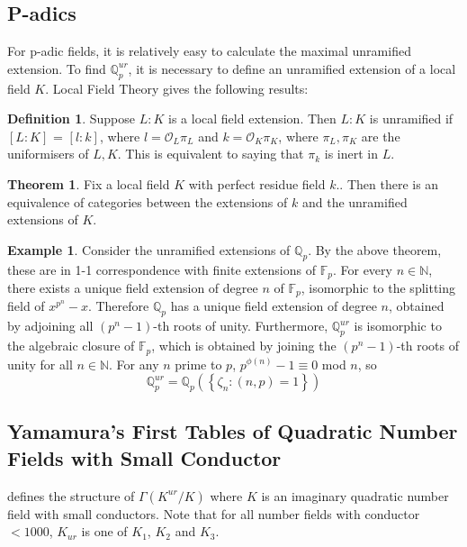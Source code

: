 \documentclass[12pt]{extarticle}
\newcommand{\N}{\mathbb{N}}
\newcommand{\F}{\mathbb{F}}
\newcommand{\Q}{\mathbb{Q}}
\newcommand{\co}{\mathcal{O}}
\newcommand{\<}{\langle}
\renewcommand{\>}{\rangle}
\theoremstyle{definition}
\newtheorem{theorem}{Theorem}
\newtheorem*{definition}{Definition}
\newtheorem*{example}{Example}
\begin{document}
\subsection{P-adics}
For p-adic fields, it is relatively easy to calculate the maximal unramified extension. 
To find $\Q_p^{ur}$, it is necessary to define an unramified extension of a local field $K$. Local Field Theory gives the following results:
\begin{definition}
Suppose $L:K$ is a local field extension. Then $L:K$ is unramified if $[L:K]$ = $[l:k]$, where $l = \co_L\pi_L$ and $ k= \co_K\pi_K$, where $\pi_L,\pi_K$ are the uniformisers of $L,K$. This is equivalent to saying that $\pi_k$ is inert in $L$. 
\end{definition}
\begin{theorem}
Fix a local field $K$ with perfect residue field $k$.. Then there is an equivalence of categories
between the extensions of $k$ and the unramified extensions of $K$. 
\end{theorem}
\begin{example}
Consider the unramified extensions of $\Q_p$. By the above theorem, these are in 1-1 correspondence with finite extensions of $\F_p$. For every $n \in \N$, there exists a unique field extension of degree $n$ of $\F_p$, isomorphic to the splitting field of $x^{p^n}-x$. Therefore $\Q_p$ has a unique field extension of degree $n$, obtained by adjoining all $\left( p^n-1\right)$-th roots of unity. Furthermore,
$\Q_p^{ur}$ is isomorphic to the algebraic closure of $\F_p$, which is obtained by joining the $\left( p^n-1\right)$-th roots of unity for all $n \in \N$. For any $n$ prime to $p$, $p^{\phi(n)}-1 \equiv 0$ mod $n$, so 
\begin{equation}
\Q_p^{ur} = \Q_p(\left\{ \zeta_n: (n,p)=1 \right\})
\end{equation}
\end{example}
\subsection{Yamamura's First Tables of Quadratic Number Fields with Small Conductor}
\cite{YAMA1997} defines the structure of $\Gamma(K^{ur}/K)$ where $K$ is an imaginary quadratic number field with small conductors. Note that for all number fields with conductor $<1000$, $K_{ur}$ is one of $K_1$, $K_2$ and $K_3$. \par 
\end{document}
